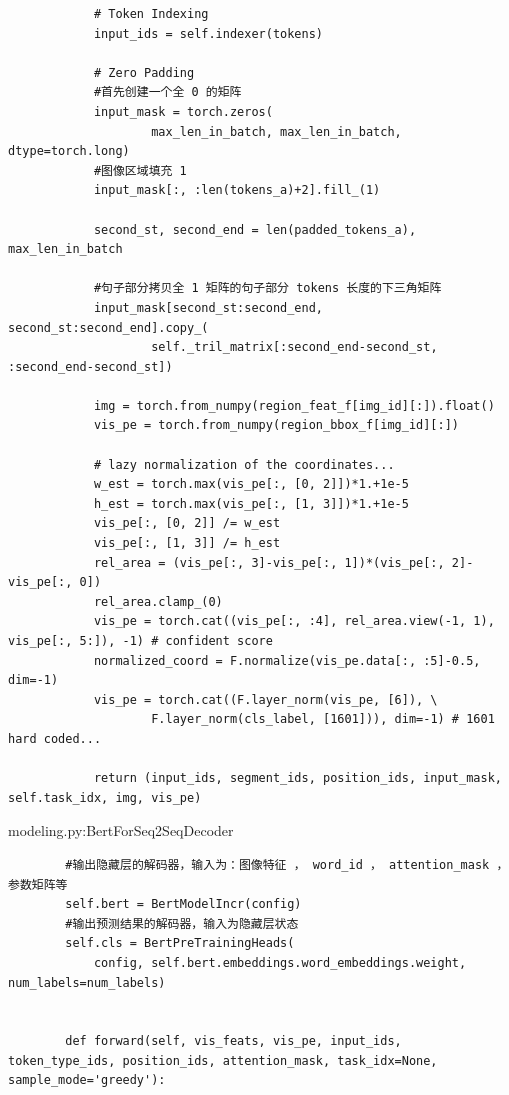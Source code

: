 \documentclass[a4paper]{article}
\begin{document}
\begin{sloppypar}
\begin{lstlisting}
            # Token Indexing
            input_ids = self.indexer(tokens)
        
            # Zero Padding
            #首先创建一个全 0 的矩阵
            input_mask = torch.zeros(
                    max_len_in_batch, max_len_in_batch, dtype=torch.long)
            #图像区域填充 1
            input_mask[:, :len(tokens_a)+2].fill_(1)

            second_st, second_end = len(padded_tokens_a), max_len_in_batch
        
            #句子部分拷贝全 1 矩阵的句子部分 tokens 长度的下三角矩阵
            input_mask[second_st:second_end, second_st:second_end].copy_(
                    self._tril_matrix[:second_end-second_st, :second_end-second_st])
        
            img = torch.from_numpy(region_feat_f[img_id][:]).float()
            vis_pe = torch.from_numpy(region_bbox_f[img_id][:])

            # lazy normalization of the coordinates...
            w_est = torch.max(vis_pe[:, [0, 2]])*1.+1e-5
            h_est = torch.max(vis_pe[:, [1, 3]])*1.+1e-5
            vis_pe[:, [0, 2]] /= w_est
            vis_pe[:, [1, 3]] /= h_est
            rel_area = (vis_pe[:, 3]-vis_pe[:, 1])*(vis_pe[:, 2]-vis_pe[:, 0])
            rel_area.clamp_(0)
            vis_pe = torch.cat((vis_pe[:, :4], rel_area.view(-1, 1), vis_pe[:, 5:]), -1) # confident score
            normalized_coord = F.normalize(vis_pe.data[:, :5]-0.5, dim=-1)
            vis_pe = torch.cat((F.layer_norm(vis_pe, [6]), \
                    F.layer_norm(cls_label, [1601])), dim=-1) # 1601 hard coded...

            return (input_ids, segment_ids, position_ids, input_mask, self.task_idx, img, vis_pe)
    \end{lstlisting}

    \newpage

    modeling.py:BertForSeq2SeqDecoder
    \begin{lstlisting}
        #输出隐藏层的解码器，输入为：图像特征 ， word_id ， attention_mask ， 参数矩阵等
        self.bert = BertModelIncr(config)
        #输出预测结果的解码器，输入为隐藏层状态
        self.cls = BertPreTrainingHeads(
            config, self.bert.embeddings.word_embeddings.weight, num_labels=num_labels)


        def forward(self, vis_feats, vis_pe, input_ids, token_type_ids, position_ids, attention_mask, task_idx=None, sample_mode='greedy'):


\end{lstlisting}
\end{sloppypar}
\end{document}

